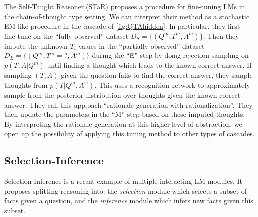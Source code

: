 

The Self-Taught Reasoner (STaR) \citep{zelikman2022star} proposes a procedure for fine-tuning LMs in the chain-of-thought type setting.
We can interpret their method as a stochastic EM-like procedure in the cascade of \cref{fig:QTAhidden}.
In particular, they first fine-tune on the ``fully observed''
dataset $D_S = \{(Q^m,T^m,A^m)\}$.
Then they impute the unknown $T_i$ values in the 
``partially observed'' dataset  $D_L = \{(Q^m,T^m=?,A^m)\}$
during the ``E'' step by doing rejection sampling on $p(T, A | Q^m)$ until finding a thought which leads to the known correct answer. If sampling $(T,A)$ given the question fails to find the correct answer, they sample thoughts from $p(T | Q^m, A^m)$. This uses a recognition network to approximately sample from the posterior distribution over thoughts given the known correct answer.
They call this approach  ``rationale generation with rationalization''. They then update the parameters in the ``M'' step based on these imputed thoughts.
By interpreting the rationale generation at this higher level of abstraction, we open up the possibility of applying this tuning method to other types of cascades.



% 

%

\subsection{Selection-Inference}
\label{sec:selection_inference}

Selection Inference \citep{selection_inference} is a recent example of multiple interacting LM modules. It proposes splitting reasoning into: the \textit{selection} module which selects a subset of facts given a question, and the \textit{inference} module which infers new facts given this subset.

